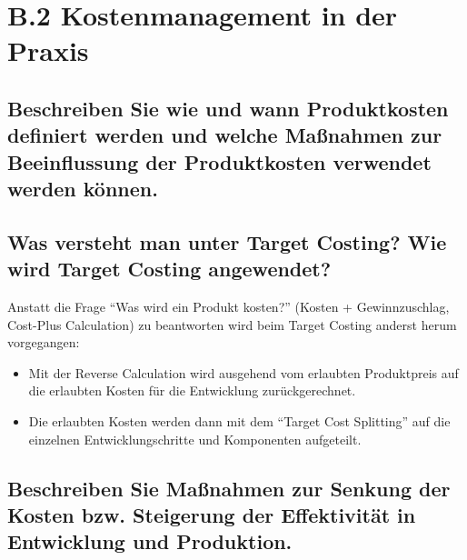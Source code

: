 \section*{B.2 Kostenmanagement in der Praxis}

\subsection{Beschreiben Sie wie und wann Produktkosten definiert werden und welche Ma\ss nahmen zur Beeinflussung der Produktkosten verwendet werden k\"onnen.}

\subsection{Was versteht man unter Target Costing? Wie wird Target Costing angewendet?}
Anstatt die Frage ``Was wird ein Produkt kosten?'' (Kosten + Gewinnzuschlag, Cost-Plus Calculation) zu beantworten wird beim
Target Costing anderst herum vorgegangen:
\begin{itemize}
	\item Mit der Reverse Calculation wird ausgehend vom erlaubten Produktpreis auf die erlaubten Kosten f\"ur die Entwicklung zur\"uckgerechnet.
	\item Die erlaubten Kosten werden dann mit dem ``Target Cost Splitting'' auf die einzelnen Entwicklungschritte und Komponenten aufgeteilt.
\end{itemize}

\subsection{Beschreiben Sie Ma\ss nahmen zur Senkung der Kosten bzw. Steigerung der Effektivit\"at in Entwicklung und Produktion.}
